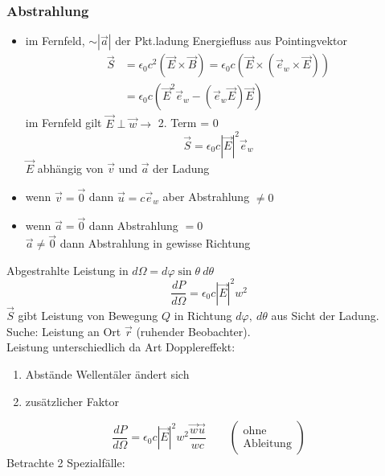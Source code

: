 \documentclass[titlepage,12pt,a4paper,ngerman]{report}
\newcommand{\tx}[1]{\textrm{#1}}
\begin{document}
\subsubsection{Abstrahlung}
\begin{itemize}
	\item im Fernfeld, $ \sim |\vec{a}| $ der Pkt.ladung
	Energiefluss aus Pointingvektor
	\begin{align*}
	\vec{S} &= \epsilon_0 c^2 (\vec{E} \times \vec{B}) = \epsilon_0 c (\vec{E} \times (\vec{e}_w \times \vec{E}))\\
	&= \epsilon_0 c (\vec{E}^2 \vec{e}_w - (\vec{e}_w \vec{E}) \vec{E})
	\end{align*}
	im Fernfeld gilt $ \vec{E} \perp \vec{w} \rightarrow $ 2. Term = 0
	$$\boxed{ \vec{S} = \epsilon_0 c |\vec{E}|^2 \vec{e}_w}$$
	$ \vec{E} $ abhängig von $ \vec{v} $ und $\vec{a}$ der Ladung
	\item wenn $ \vec{v} = \vec{0} $ dann $ \vec{u} = c \vec{e}_w $ aber Abstrahlung $ \neq 0 $
	\item wenn $ \vec{a} = \vec{0} $ dann Abstrahlung $ = 0 $\\
	$ \vec{a} \neq \vec{0} $ dann Abstrahlung in gewisse Richtung\\
\end{itemize}
Abgestrahlte Leistung in $ d\Omega = d \varphi \sin \theta \ d \theta $
$$\frac{d P}{d \Omega} = \epsilon_0 c |\vec{E}|^2 w^2$$
$ \vec{S} $ gibt Leistung von Bewegung $ Q $ in Richtung $ d \varphi, \ d \theta $ aus Sicht der Ladung.\\
Suche: Leistung an Ort $ \vec{r} $ (ruhender Beobachter).\\
Leistung unterschiedlich da Art Dopplereffekt:
\begin{enumerate}[$ \rightarrow $]
	\item Abstände Wellentäler ändert sich
	\item zusätzlicher Faktor
\end{enumerate}
$$\frac{d P}{d \Omega} = \epsilon_0 c | \vec{E}|^2 w^2 \frac{\vec{w} \vec{u}}{w c} \qquad (\substack{\tx{ohne} \\ \tx{Ableitung}})$$
Betrachte 2 Spezialfälle:
\end{document}
